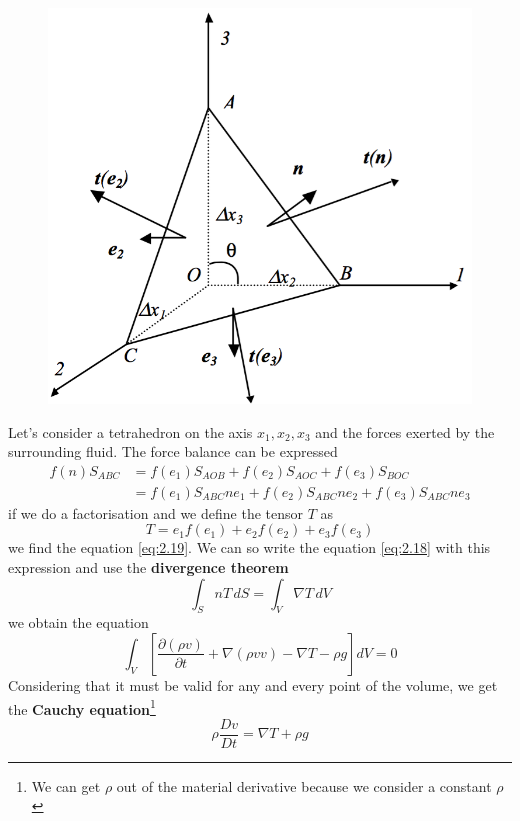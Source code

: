 		\begin{figure}
		\vspace{-5mm}
		\includegraphics[scale=0.4]{ch2/4}
		\end{figure}
		Let's consider a tetrahedron on the axis $x_1,x_2,x_3$ and the forces exerted by the surrounding fluid. The force balance can be expressed 
		\begin{equation}
		\begin{aligned}
			f(n) S_{ABC} &= f(e_1) S_{AOB} + f(e_2) S_{AOC} + f(e_3) S_{BOC} \\
			&= f(e_1) S_{ABC} n e_1 + f(e_2) S_{ABC} n e_2 + f(e_3) S_{ABC} n e_3
			\end{aligned}
		\end{equation}
		if we do a factorisation and we define the tensor $T$ as
		\begin{equation}
			T = e_1f(e_1)+e_2f(e_2)+e_3f(e_3)
		\end{equation}
		we find the equation \autoref{eq:2.19}. We can so write the equation \autoref{eq:2.18} with this expression and use the \textbf{divergence theorem}
		\begin{equation}
			\int _S nT \, dS = \int _V \nabla T \, dV 
		\end{equation}
		we obtain the equation 
		\begin{equation}
			\int _V \left[ \frac{\partial (\rho v)}{\partial t} + \nabla (\rho vv) - \nabla T - \rho g \right] dV = 0
		\end{equation}
		Considering that it must be valid for any and every point of the volume, we get the \textbf{Cauchy equation}\footnote{We can get $\rho$ out of the material derivative because we consider a constant $\rho$}
		\begin{equation}
			\rho \frac{Dv}{Dt} = \nabla T + \rho g
			\label{eq:cauchy}
		\end{equation}

